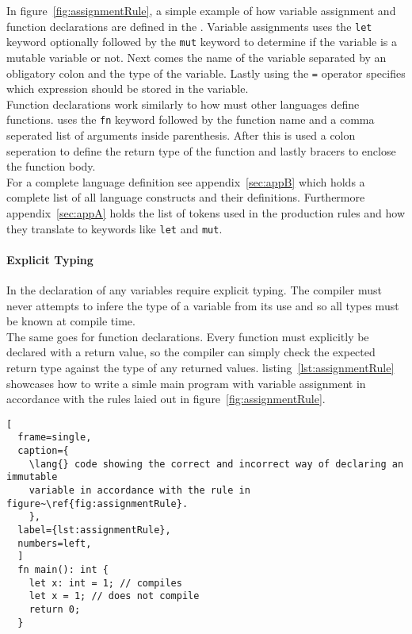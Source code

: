 In figure~\ref{fig:assignmentRule}, a simple example of how
variable assignment and function declarations are defined in the \lang. Variable
assignments uses the
\texttt{let} keyword optionally followed by the \texttt{mut} keyword to determine if
the variable is a mutable variable or not. Next comes the name of the variable
separated by an obligatory colon and the type of the variable. Lastly using the
\texttt{=} operator specifies which expression should be stored in the variable. \\

Function declarations work similarly to how must other languages define functions.
\lang{} uses the \texttt{fn} keyword followed by the function name and a comma
seperated list of arguments inside parenthesis. After this is used a colon
seperation to define the return type of the function and lastly bracers to enclose
the function body. \\

For a complete language definition see appendix~\ref{sec:appB} which holds a
complete list of all language constructs and their definitions. Furthermore
appendix~\ref{sec:appA} holds the list of tokens used in the production rules and how
they translate to keywords like \texttt{let} and \texttt{mut}.


\paragraph{Explicit Typing} \hfill
\vspace{0.1em}

In \lang{} the declaration of any variables require explicit typing. The compiler
must never attempts to infere the type of a variable from its use and so all types
must be known at compile time.\\

The same goes for function declarations. Every function must explicitly be declared
with a return value, so the compiler can simply check the expected return type
against the type of any returned values. listing~\ref{lst:assignmentRule} showcases
how to write a simle main program with variable assignment in accordance with the
rules laied out in figure~\ref{fig:assignmentRule}.

\begin{lstlisting}[
  frame=single,
  caption={
    \lang{} code showing the correct and incorrect way of declaring an immutable
    variable in accordance with the rule in figure~\ref{fig:assignmentRule}.
    },
  label={lst:assignmentRule},
  numbers=left,
  ]
  fn main(): int {
    let x: int = 1; // compiles
    let x = 1; // does not compile
    return 0;
  }
\end{lstlisting}

